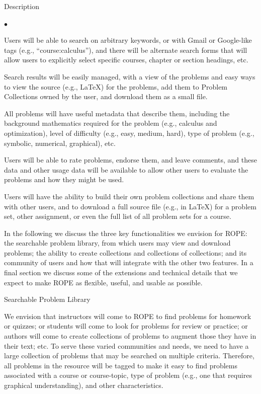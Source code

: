 \documentclass[11pt]{article}
\begin{document}
\begin{section}{Description}
\begin{list}{$\bullet$}{\setlength{\parsep}{0pt}\setlength{\itemsep}{0pt}}
  \item
    Users will be able to search on arbitrary keywords, or with Gmail or
    Google-like tags (e.g., ``course:calculus''), and there will be
    alternate search forms that will allow users to explicitly select
    specific courses, chapter or section headings, etc.
  \item
    Search results will be easily managed, with a view of the problems and
    easy ways to view the source (e.g., \LaTeX) for the problems, add them
    to Problem Collections owned by the user, and download them as a small
    file.
  \item
    All problems will have useful metadata that describe them, including
    the background mathematics required for the problem (e.g., calculus
    and optimization), level of difficulty (e.g., easy, medium, hard),
    type of problem (e.g., symbolic, numerical, graphical), etc.
  \item
    Users will be able to rate problems, endorse them, and leave comments,
    and these data and other usage data will be available to allow other
    users to evaluate the problems and how they might be used.
  \item
    Users will have the ability to build their own problem collections and
    share them with other users, and to download a full source file (e.g.,
    in \LaTeX) for a problem set, other assignment, or even the full list
    of all problem sets for a course. 
\end{list}

In the following we discuss the three key functionalities we envision for
ROPE: the searchable problem library, from which users may view and
download problems; the ability to create collections and collections of
collections; and its community of users and how that will integrate with
the other two features.  In a final section we discuss some of the
extensions and technical details that we expect to make ROPE as flexible,
useful, and usable as possible.

\begin{subsection}{Searchable Problem Library}

We envision that instructors will come to ROPE to find problems for
homework or quizzes; or students will come to look for problems for review
or practice; or authors will come to create collections of problems to
augment those they have in their text; etc.  To serve these varied
communities and needs, we need to have a large collection of problems that
may be searched on multiple criteria.  Therefore, all problems in the
resource will be tagged to make it easy to find problems associated with a
course or course-topic, type of problem (e.g., one that requires graphical
understanding), and other characteristics.


\end{subsection}
\end{section}
\end{document}
